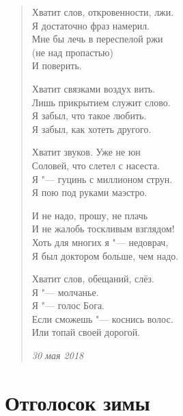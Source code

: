 \documentclass[a4paper,12pt]{article}
\begin{document}
\begin{verse}
Хватит слов, откровенности, лжи.\\
Я достаточно фраз намерил.\\
Мне бы лечь в переспелой ржи\\
(не над пропастью)\\
И поверить.

Хватит связками воздух вить.\\
Лишь прикрытием служит слово.\\
Я забыл, что такое любить.\\
Я забыл, как хотеть другого.

Хватит звуков. Уже не юн\\
Соловей, что слетел с насеста.\\
Я "--- гуцинь с миллионом струн.\\
Я пою под руками маэстро.

И не надо, прошу, не плачь\\
И не жалобь тоскливым взглядом!\\
Хоть для многих я "--- недоврач,\\
Я был доктором больше, чем надо.

Хватит слов, обещаний, слёз.\\
Я "--- молчанье.\\
Я "--- голос Бога.\\
Если сможешь "--- коснись волос.\\
Или топай своей дорогой.

\emph{30 мая 2018}
\end{verse} 
\newpage

\section{Отголосок зимы}
\end{document}
